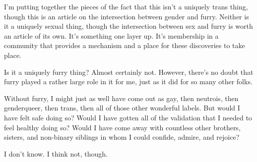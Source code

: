 I'm putting together the pieces of the fact that this isn't a uniquely trans thing, though this is an article on the intersection between gender and furry.  Neither is it a uniquely sexual thing, though the intersection between sex and furry is worth an article of its own.  It's something one layer up.  It's membership in a community that provides a mechanism and a place for these discoveries to take place.

Is it a uniquely furry thing?  Almost certainly not.  However, there's no doubt that furry played a rather large role in it for me, just as it did for so many other folks.

Without furry, I might just as well have come out as gay, then neutrois, then genderqueer, then trans, then all of those other wonderful labels.  But would I have felt safe doing so?  Would I have gotten all of the validation that I needed to feel healthy doing so?  Would I have come away with countless other brothers, sisters, and non-binary siblings in whom I could confide, admire, and rejoice?

I don't know.  I think not, though.
